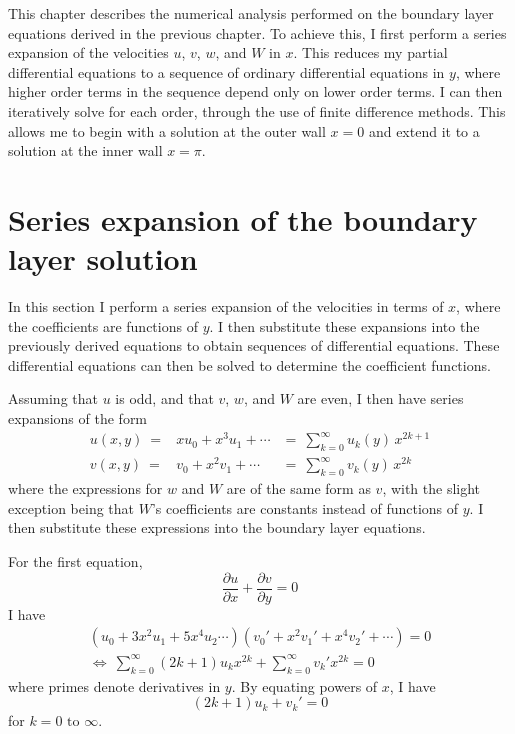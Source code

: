 \documentclass[10pt,a4paper]{report}
\begin{document}
This chapter describes the numerical analysis performed on the boundary layer equations derived in the previous chapter. To achieve this, I first perform a series expansion of the velocities $u$, $v$, $w$, and $W$ in $x$. This reduces my partial differential equations to a sequence of ordinary differential equations in $y$, where higher order terms in the sequence depend only on lower order terms. I can then iteratively solve for each order, through the use of finite difference methods. This allows me to begin with a solution at the outer wall $x = 0$ and extend it to a solution at the inner wall $x = \pi$.

\section{Series expansion of the boundary layer solution}

In this section I perform a series expansion of the velocities in terms of $x$, where the coefficients are functions of $y$. I then substitute these expansions into the previously derived equations to obtain sequences of differential equations. These differential equations can then be solved to determine the coefficient functions.

Assuming that $u$ is odd, and that $v$, $w$, and $W$ are even, I then have series expansions of the form
\begin{eqnarray}
u(x,y) \ =& x u_0 + x^3 u_1 + \dotsb &= \ \sum_{k=0}^\infty u_k(y) \, x^{2k+1} \\
v(x,y) \ =& v_0 + x^2 v_1 + \dotsb &= \ \sum_{k=0}^\infty v_k(y) \, x^{2k}
\end{eqnarray}
where the expressions for $w$ and $W$ are of the same form as $v$, with the slight exception being that $W$'s coefficients are constants instead of functions of $y$. I then substitute these expressions into the boundary layer equations.

For the first equation,
\begin{equation}\label{layer1}
\frac{\partial u}{\partial x} + \frac{\partial v}{\partial y} = 0
\end{equation}
I have
\begin{gather*}
(u_0 + 3 x^2 u_1 + 5 x^4 u_2 \dotsb) (v_0' + x^2 v_1' + x^4 v_2' + \dotsb) = 0 \\
\Leftrightarrow \ \sum_{k=0}^\infty (2k+1) u_k x^{2k} + \sum_{k=0}^\infty v_k' x^{2k} = 0
\end{gather*}
where primes denote derivatives in $y$. By equating powers of $x$, I have
\begin{equation}
(2k+1) u_k + v_k' = 0
\end{equation}
for $k = 0 \text{ to } \infty$.
\end{document}
